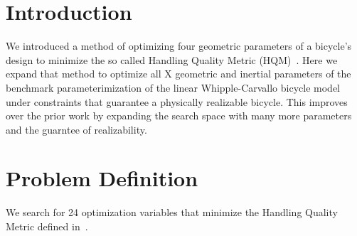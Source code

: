 \documentclass{bmd2019a}
\begin{document}
\section{Introduction}
%
We introduced a method of optimizing four geometric parameters of a bicycle's
design to minimize the so called Handling Quality Metric
(HQM)~\cite{Moore2016}. Here we expand that method to optimize all X geometric
and inertial parameters of the benchmark parameterimization of the linear
Whipple-Carvallo bicycle model under constraints that guarantee a physically
realizable bicycle. This improves over the prior work by expanding the search
space with many more parameters and the guarntee of realizability.

\section{Problem Definition}
%
We search for 24 optimization variables that minimize the Handling Quality
Metric defined in~\cite{Hess2012}.
\end{document}
